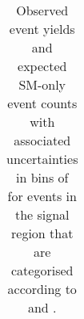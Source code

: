 \begin{table}[h!]
  \caption{Observed event yields and expected SM-only event counts
    with associated uncertainties in bins of \scalht for events in the
    signal region that are categorised according to \njet and \nb.}
  \label{tab:fit-result}
  \centering
  \tiny
  \begin{tabular}{ llllllllllllll }
    \hline
    \hline
  \end{tabular}
\end{table}
